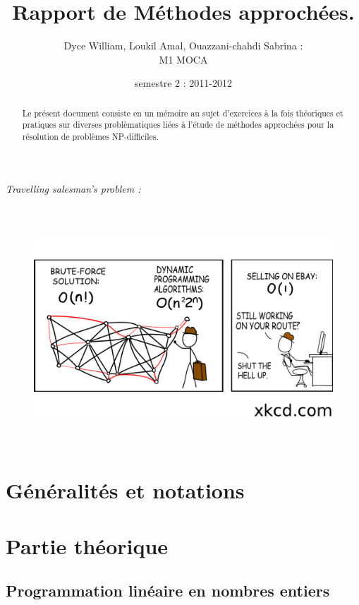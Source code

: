 \documentclass[a4paper, 12pt]{article}
\title{Rapport de Méthodes approchées.}
\author{Dyce William, Loukil Amal, Ouazzani-chahdi Sabrina : \\ M1 MOCA}
\date{semestre 2 : 2011-2012}
\begin{document}
 

\maketitle

\begin{abstract}
  Le présent document consiste en un mémoire au sujet
  d'exercices à la fois théoriques et pratiques sur diverses
  problèmatiques liées à l'étude de méthodes approchées pour la
  résolution de problèmes NP-difficiles. 
\end{abstract}
\vspace{2cm}
\textit{Travelling salesman's problem :}
\begin{figure}[h!]
\centering
\includegraphics[height = 9cm]{commerce.png}
\end{figure}


\pagebreak

\tableofcontents

\pagebreak

\listoffigures

\listoftables
\pagebreak

\section{Généralités et notations}

\section{Partie théorique}

\subsection{Programmation linéaire en nombres entiers}
\end{document}
